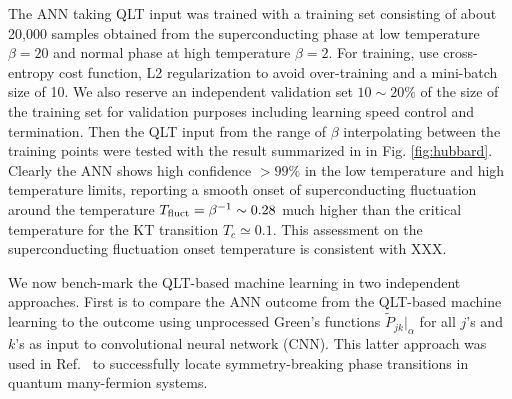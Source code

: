 \documentclass[amsmath,amssymb, aps, prl, twocolumn]{revtex4-1}
\begin{document}


The ANN taking QLT input was trained with a training set consisting of about 20,000 samples obtained from the superconducting phase at low temperature $\beta=20$ and normal phase at high temperature $\beta=2$. 
For training, use cross-entropy cost function, L2 regularization to avoid over-training and a mini-batch size of 10. We also reserve an independent validation set $10\sim 20\%$ of the size of the training set for validation purposes including learning speed control and termination\cite{MLbook}.
Then the QLT input from the range of $\beta$ interpolating between the training points were tested with the result summarized in in Fig. \ref{fig:hubbard}. 
Clearly the ANN shows high confidence  $>99\%$ in the low temperature and high temperature limits, reporting a smooth onset of superconducting fluctuation around the temperature $T_{\rm fluct}=\beta^{-1} \sim 0.28$ much higher than the critical temperature for the KT transition $T_c\simeq 0.1$\cite{Scalapino1993}. {\color {red}This assessment on the superconducting fluctuation onset temperature is consistent with XXX. }

We now bench-mark the QLT-based machine learning in two independent approaches. First is to compare the ANN outcome from the QLT-based machine learning to the outcome using unprocessed Green's functions $\widetilde{P}_{jk}|_{\alpha}$ for all $j$'s and $k$'s as input to convolutional neural network (CNN). This latter approach was used in Ref.~\cite{Simon2016} to successfully locate symmetry-breaking phase transitions 
in quantum many-fermion systems. 
\end{document}
